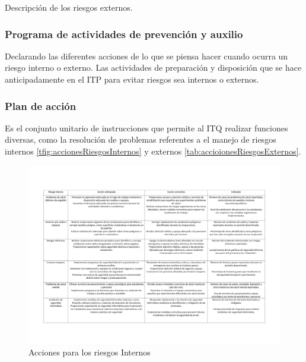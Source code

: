     Descripción de los riesgos externos.
    \subsubsection{Programa de actividades de prevención y auxilio}
    
    Declarando las diferentes acciones de lo que se piensa hacer cuando ocurra un riesgo interno o externo. 
    Las actividades de preparación y disposición que se hace anticipadamente en el ITP para evitar riesgos sea internos o externos.
    \subsubsection{Plan de acción}
    
    
    Es el conjunto unitario de instrucciones que permite al ITQ realizar funciones diversas, como la resolución de problemas referentes a el manejo de riesgos internos \ref{tfig:accionesRiesgosInternos} y externos \ref{tab:accioionesRiesgosExternos}.
    
    \begin{figure}[H]
        \centering
        \includegraphics[scale=0.150]{21/img/accionesRiesgosInternos.pdf}
        \caption{Acciones para los riesgos Internos}
        \label{fig:accionesRiesgosInternos}
    \end{figure}
    

